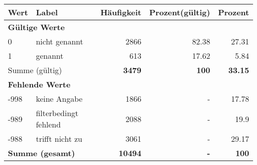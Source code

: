      \begin{longtable}{lXrrr}
     \toprule
     \textbf{Wert} & \textbf{Label} & \textbf{Häufigkeit} & \textbf{Prozent(gültig)} & \textbf{Prozent} \\
     \endhead
     \midrule
     \multicolumn{5}{l}{\textbf{Gültige Werte}}\\

     0 &
     \multicolumn{1}{X}{ nicht genannt   } &


       \num{2866} &
       \num[round-mode=places,round-precision=2]{82,38} &
         \num[round-mode=places,round-precision=2]{27,31} \\

     1 &
     \multicolumn{1}{X}{ genannt   } &


       \num{613} &
       \num[round-mode=places,round-precision=2]{17,62} &
         \num[round-mode=places,round-precision=2]{5,84} \\
     \midrule
     \multicolumn{2}{l}{Summe (gültig)} &
       \textbf{\num{3479}} &
     \textbf{100} &
       \textbf{\num[round-mode=places,round-precision=2]{33,15}} \\
     \multicolumn{5}{l}{\textbf{Fehlende Werte}}\\
       -998 &
       keine Angabe &
         \num{1866} &
        - &
         \num[round-mode=places,round-precision=2]{17,78} \\
       -989 &
       filterbedingt fehlend &
         \num{2088} &
        - &
         \num[round-mode=places,round-precision=2]{19,9} \\
       -988 &
       trifft nicht zu &
         \num{3061} &
        - &
         \num[round-mode=places,round-precision=2]{29,17} \\
     \midrule
     \multicolumn{2}{l}{\textbf{Summe (gesamt)}} &
          \textbf{\num{10494}} &
        \textbf{-} &
        \textbf{100} \\
     \bottomrule
     \end{longtable}
     
